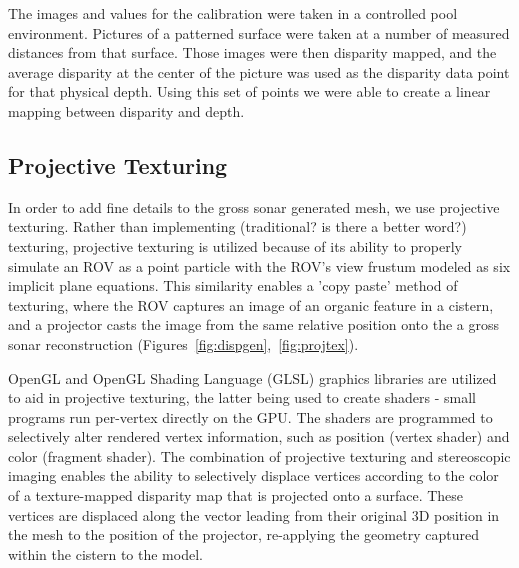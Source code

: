 \documentclass[a4paper,twoside]{article}
\begin{document}
The images and values for the calibration were taken in a controlled pool environment.  
Pictures of a patterned surface were taken at a number of measured distances from that surface. 
Those images were then disparity mapped, and the average disparity at the center of the picture was used as the disparity data point for that physical depth.
Using this set of points we were able to create a linear mapping between disparity and depth.


\subsection{Projective Texturing}




\noindent In order to add fine details to the gross sonar generated mesh, we use projective texturing. Rather than implementing (traditional? is there a better word?) texturing, projective texturing is utilized because of its ability to properly simulate an ROV as a point particle with the ROV's view frustum modeled as six implicit plane equations. This similarity enables a 'copy paste' method of texturing, where the ROV captures an image of an organic feature in a cistern, and a projector casts the image from the same relative position onto the a gross sonar reconstruction (Figures~\ref{fig:dispgen},~\ref{fig:projtex}). 

OpenGL and OpenGL Shading Language (GLSL) graphics libraries are utilized to aid in projective texturing, the latter being used to create shaders - small programs run per-vertex directly on the GPU. The shaders are programmed to selectively alter rendered vertex information, such as position (vertex shader) and color (fragment shader). The combination of projective texturing and stereoscopic imaging enables the ability to selectively displace vertices according to the color of a texture-mapped disparity map that is projected onto a surface. These vertices are displaced along the vector leading from their original 3D position in the mesh to the position of the projector, re-applying the geometry captured within the cistern to the model.
\end{document}
